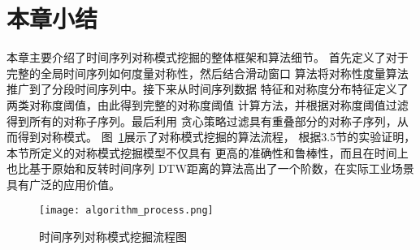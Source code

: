 \section{本章小结}
本章主要介绍了时间序列对称模式挖掘的整体框架和算法细节。
首先定义了对于完整的全局时间序列如何度量对称性，然后结合滑动窗口
算法将对称性度量算法推广到了分段时间序列中。接下来从时间序列数据
特征和对称度分布特征定义了两类对称度阈值，由此得到完整的对称度阈值
计算方法，并根据对称度阈值过滤得到所有的对称子序列。最后利用
贪心策略过滤具有重叠部分的对称子序列，从而得到对称模式。
图~\ref{fig:algorithm_process}展示了对称模式挖掘的算法流程，
根据3.5节的实验证明，本节所定义的对称模式挖掘模型不仅具有
更高的准确性和鲁棒性，而且在时间上也比基于原始和反转时间序列
DTW距离的算法高出了一个阶数，在实际工业场景具有广泛的应用价值。
\begin{figure}
  \centering
  \texttt{[image: algorithm\_process.png]}
  \caption{时间序列对称模式挖掘流程图}
  \label{fig:algorithm_process}
\end{figure}